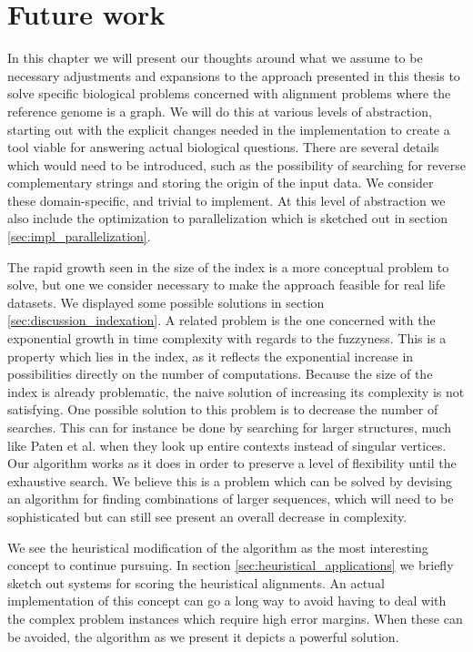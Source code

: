 \documentclass[thesis.tex]{subfiles}
\begin{document}
\chapter{Future work}
\label{sec:future_work}
In this chapter we will present our thoughts around what we assume to be necessary adjustments and expansions to the approach presented in this thesis to solve specific biological problems concerned with alignment problems where the reference genome is a graph. We will do this at various levels of abstraction, starting out with the explicit changes needed in the implementation to create a tool viable for answering actual biological questions. There are several details which would need to be introduced, such as the possibility of searching for reverse complementary strings and storing the origin of the input data. We consider these domain-specific, and trivial to implement. At this level of abstraction we also include the optimization to parallelization which is sketched out in section \ref{sec:impl_parallelization}.\\
\par\noindent
The rapid growth seen in the size of the index is a more conceptual problem to solve, but one we consider necessary to make the approach feasible for real life datasets. We displayed some possible solutions in section \ref{sec:discussion_indexation}. A related problem is the one concerned with the exponential growth in time complexity with regards to the fuzzyness. This is a property which lies in the index, as it reflects the exponential increase in possibilities directly on the number of computations. Because the size of the index is already problematic, the naive solution of increasing its complexity is not satisfying. One possible solution to this problem is to decrease the number of searches. This can for instance be done by searching for larger structures, much like Paten et al. when they look up entire contexts instead of singular vertices. Our algorithm works as it does in order to preserve a level of flexibility until the exhaustive search. We believe this is a problem which can be solved by devising an algorithm for finding combinations of larger sequences, which will need to be sophisticated but can still see present an overall decrease in complexity.\\ 
\par\noindent
We see the heuristical modification of the algorithm as the most interesting concept to continue pursuing. In section \ref{sec:heuristical_applications} we briefly sketch out systems for scoring the heuristical alignments. An actual implementation of this concept can go a long way to avoid having to deal with the complex problem instances which require high error margins. When these can be avoided, the algorithm as we present it depicts a powerful solution.\\
\end{document}
